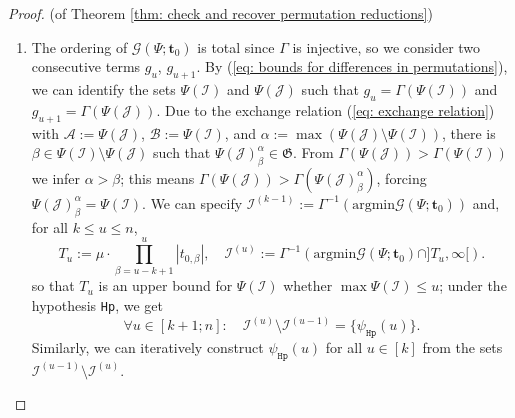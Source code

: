 \documentclass[10pt]{article}
\theoremstyle{remark}%
\theoremstyle{definition}%
\begin{document}
\begin{proof}{(of Theorem \ref{thm: check and recover permutation reductions})}
\begin{enumerate}
In particular, the order obtained from this query produces the mapping $\Gamma(\mathcal{A}):=|g(\Psi^{-1}(\mathcal{A}))\cdot \mathbf{t}_{0}^{\mathtt{Ind}(\mathcal{A})}|$ with $\mathcal{A}\in\mathfrak{G}$: being the terms in $\mathcal{G}(\Psi;\mathbf{t}_{0})$ distinct, $\Gamma$ is injective.
\item The ordering of $\mathcal{G}(\Psi;\mathbf{t}_{0})$ is total since $\Gamma$ is injective, so we consider two consecutive terms $g_{u}$, $g_{u+1}$. By (\ref{eq: bounds for differences in permutations}), we can identify the sets $\Psi(\mathcal{I})$ and $\Psi(\mathcal{J})$ such that $g_{u}=\Gamma(\Psi(\mathcal{I}))$ and $g_{u+1}=\Gamma(\Psi(\mathcal{J}))$. 
Due to the exchange relation (\ref{eq: exchange relation}) with $\mathcal{A}:=\Psi(\mathcal{J})$, $\mathcal{B}:=\Psi(\mathcal{I})$, and $\alpha:=\max\left(\Psi(\mathcal{J})\setminus\Psi(\mathcal{I})\right)$, there is $\beta\in\Psi(\mathcal{I})\setminus\Psi(\mathcal{J})$ such that $\Psi(\mathcal{J})_{\beta}^{\alpha}\in\mathfrak{G}$. From $\Gamma(\Psi(\mathcal{J}))>\Gamma(\Psi(\mathcal{I}))$ we infer $\alpha>\beta$; this means $\Gamma(\Psi(\mathcal{J}))>\Gamma(\Psi(\mathcal{J})_{\beta}^{\alpha})$, forcing $\Psi(\mathcal{J})_{\beta}^{\alpha}=\Psi(\mathcal{I})$. We can specify
$\mathcal{I}^{(k-1)}:=\Gamma^{-1}(\mathrm{argmin}\mathcal{G}(\Psi;\mathbf{t}_{0}))$ and, for all $k\leq u\leq n$, 
\begin{equation} 
T_{u}:=\mu\cdot\prod_{\beta=u-k+1}^{u}|t_{0,\beta}|,\quad\mathcal{I}^{(u)}:=\Gamma^{-1}\left(\mathrm{argmin}\mathcal{G}(\Psi;\mathbf{t}_{0})\cap]T_{u},\infty[\right).
\end{equation}
so that $T_{u}$ is an upper bound for $\Psi(\mathcal{I})$ whether $\max\Psi(\mathcal{I})\leq u$; under the hypothesis \texttt{Hp}, we get 
\begin{equation}
\forall u\in[k+1;n]:\quad \mathcal{I}^{(u)}\setminus\mathcal{I}^{(u-1)}=\{\psi_{\mathtt{Hp}}(u)\}.
\label{eq: check on out-of-row cardinality}
\end{equation}
Similarly, we can iteratively construct $\psi_{\mathtt{Hp}}(u)$ for all $u\in[k]$ from the sets $\mathcal{I}^{(u-1)}\setminus \mathcal{I}^{(u)}$.

\end{enumerate}
\end{proof}
\end{document}

